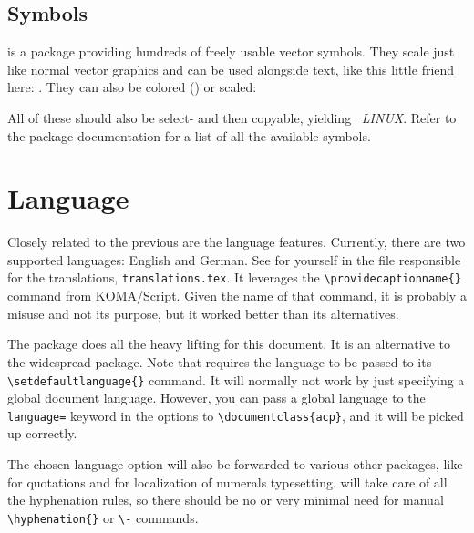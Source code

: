 \subsection{Symbols}

 is a package providing hundreds of freely usable vector
symbols.
They scale just like normal vector graphics and can be used alongside text, like
this little friend here: .
They can also be colored (\textcolor{mRed}{}) or scaled:
\begin{center}
\end{center}
All of these should also be select- and then copyable, yielding \
\emph{LINUX}.
Refer to the package documentation for a list of all the available symbols.

\section{Language}

Closely related to the previous  are the language features.
Currently, there are two supported languages: English and German.
See for yourself in the file responsible for the translations, \verb|translations.tex|.
It leverages the \verb|\providecaptionname{}| command from KOMA\-/Script.
Given the name of that command, it is probably a misuse and not its purpose, but
it worked better than its alternatives.

The  package does all the heavy lifting for this document.
It is an alternative to the widespread \ctanpackage{babel} package.
Note that \ctanpackage{polyglossia} requires the language to be passed to its
\verb|\setdefaultlanguage{}| command.
It will normally not work by just specifying a global document language.
However, you can pass a global language to the \verb|language=| keyword in the
options to \verb|\documentclass{acp}|, and it will be picked up correctly.

The chosen language option will also be forwarded to various other packages, like
\ctanpackage{enquote} for quotations and \ctanpackage{siunitx} for localization of
numerals typesetting.
 will take care of all the hyphenation rules, so there
should be no or very minimal need for manual \verb|\hyphenation{}| or \verb|\-|
commands.

